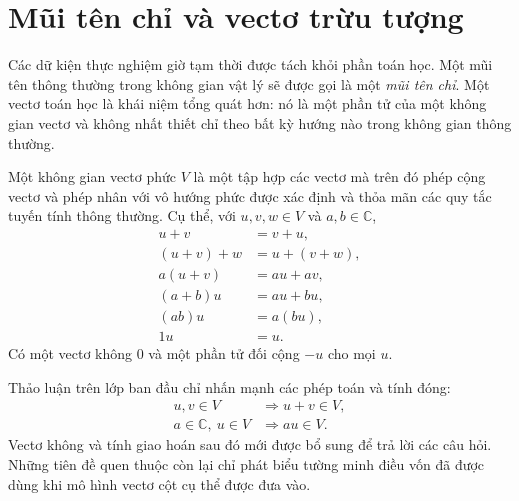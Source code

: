 \begin{classroomqa}
\end{classroomqa}

\section{Mũi tên chỉ và vectơ trừu tượng}

Các dữ kiện thực nghiệm giờ tạm thời được tách khỏi phần toán học. Một mũi tên thông thường trong không gian vật lý sẽ được gọi là một \emph{mũi tên chỉ}. Một vectơ toán học là khái niệm tổng quát hơn: nó là một phần tử của một không gian vectơ và không nhất thiết chỉ theo bất kỳ hướng nào trong không gian thông thường.

\begin{definition}
Một không gian vectơ phức \(V\) là một tập hợp các vectơ mà trên đó phép cộng vectơ và phép nhân với vô hướng phức được xác định và thỏa mãn các quy tắc tuyến tính thông thường. Cụ thể, với \(u,v,w\in V\) và \(a,b\in\mathbb C\),
\begin{align}
  u+v&=v+u,\\
  (u+v)+w&=u+(v+w),\\
  a(u+v)&=au+av,\\
  (a+b)u&=au+bu,\\
  (ab)u&=a(bu),\\
  1u&=u.
\end{align}
Có một vectơ không \(0\) và một phần tử đối cộng \(-u\) cho mọi \(u\).
\end{definition}

Thảo luận trên lớp ban đầu chỉ nhấn mạnh các phép toán và tính đóng:
\begin{equation}
\begin{aligned}
  u,v\in V&\Longrightarrow u+v\in V,\\
  a\in\mathbb C,\ u\in V&\Longrightarrow au\in V.
\end{aligned}
\end{equation}
Vectơ không và tính giao hoán sau đó mới được bổ sung để trả lời các câu hỏi. Những tiên đề quen thuộc còn lại chỉ phát biểu tường minh điều vốn đã được dùng khi mô hình vectơ cột cụ thể được đưa vào.

